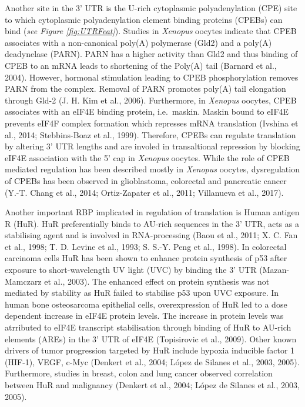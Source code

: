 \documentclass[12pt,openany]{book}
\begin{document}
Another site in the 3' UTR is the U-rich cytoplasmic polyadenylation
(CPE) site to which cytoplasmic polyadenylation element binding proteins
(CPEBs) can bind (\emph{see Figure \ref{fig:UTRFeat}}). Studies in
\emph{Xenopus} oocytes indicate that CPEB associates with a
non-canonical poly(A) polymerase (Gld2) and a poly(A) deadynelase
(PARN). PARN has a higher activity than Gld2 and thus binding of CPEB to
an mRNA leads to shortening of the Poly(A) tail (Barnard et al., 2004).
However, hormonal stimulation leading to CPEB phosphorylation removes
PARN from the complex. Removal of PARN promotes poly(A) tail elongation
through Gld-2 (J. H. Kim et al., 2006). Furthermore, in \emph{Xenopus}
oocytes, CPEB associates with an eIF4E binding protein, i.e.~maskin.
Maskin bound to eIF4E prevents eIF4F complex formation which represses
mRNA translation (Ivshina et al., 2014; Stebbins-Boaz et al., 1999).
Therefore, CPEBs can regulate translation by altering 3' UTR lengths and
are involed in transaltional repression by blocking eIF4E association
with the 5' cap in \emph{Xenopus} oocytes. While the role of CPEB
mediated regulation has been described mostly in \emph{Xenopus} oocytes,
dysregulation of CPEBs has been observed in glioblastoma, colorectal and
pancreatic cancer (Y.-T. Chang et al., 2014; Ortiz-Zapater et al., 2011;
Villanueva et al., 2017).

Another important RBP implicated in regulation of translation is Human
antigen R (HuR). HuR preferentially binds to AU-rich sequences in the 3'
UTR, acts as a stabilising agent and is involved in RNA-processing (Baou
et al., 2011; X. C. Fan et al., 1998; T. D. Levine et al., 1993; S.
S.-Y. Peng et al., 1998). In colorectal carcinoma cells HuR has been
shown to enhance protein synthesis of p53 after exposure to
short-wavelength UV light (UVC) by binding the 3' UTR (Mazan-Mamczarz et
al., 2003). The enhanced effect on protein synthesis was not mediated by
stability as HuR failed to stabilise p53 upon UVC exposure. In human
bone osteosarcoma epithelial cells, overexpression of HuR led to a dose
dependent increase in eIF4E protein levels. The increase in protein
levels was atrributed to eIF4E transcript stabilisation through binding
of HuR to AU-rich elements (AREs) in the 3' UTR of eIF4E (Topisirovic et
al., 2009). Other known drivers of tumor progression targeted by HuR
include hypoxia inducible factor 1 (HIF-1), VEGF, c-Myc (Denkert et al.,
2004; López de Silanes et al., 2003, 2005). Furthermore, studies in
breast, colon and lung cancer observed correlation between HuR and
malignancy (Denkert et al., 2004; López de Silanes et al., 2003, 2005).
\end{document}
